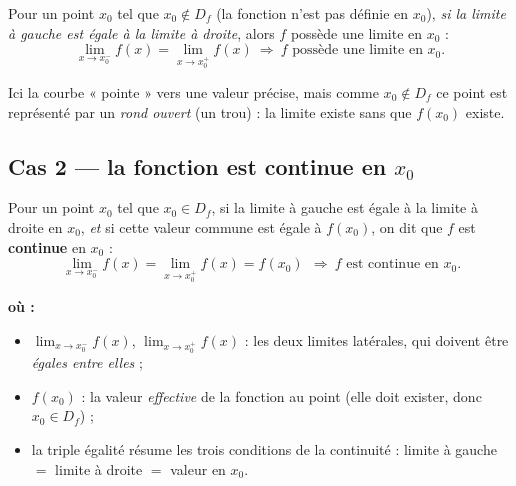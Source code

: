 \documentclass[11pt,a4paper]{article}
\newenvironment{ou}{%
  \par\smallskip\noindent\textbf{où :}\nopagebreak
  \begin{itemize}[leftmargin=1.8em,topsep=2pt,itemsep=1.5pt,parsep=0pt]}%
  {\end{itemize}}
\begin{document}
\begin{theoreme}
Pour un point $x_0$ tel que $x_0\notin D_f$ (la fonction n'est pas définie en $x_0$),
\emph{si la limite à gauche est égale à la limite à droite}, alors $f$ possède une limite en $x_0$ :
\[ \lim_{x\to x_0^{-}} f(x)=\lim_{x\to x_0^{+}} f(x)\ \Longrightarrow\ f\text{ possède une limite en }x_0. \]
\end{theoreme}

\noindent Ici la courbe « pointe » vers une valeur précise, mais comme $x_0\notin D_f$ ce point
est représenté par un \emph{rond ouvert} (un trou) : la limite existe sans que $f(x_0)$ existe.

\begin{center}
\end{center}

\subsection{Cas 2 — la fonction est continue en \texorpdfstring{$x_0$}{x0}}

\begin{definition}
Pour un point $x_0$ tel que $x_0\in D_f$, si la limite à gauche est égale à la limite à droite
en $x_0$, \emph{et} si cette valeur commune est égale à $f(x_0)$, on dit que $f$ est
\textbf{continue} en $x_0$ :
\[ \boxed{\ \lim_{x\to x_0^{-}} f(x)=\lim_{x\to x_0^{+}} f(x)=f(x_0)\ }\ \Longrightarrow\ f\text{ est continue en }x_0. \]
\end{definition}

\begin{ou}
  \item $\displaystyle\lim_{x\to x_0^{-}} f(x)$, $\displaystyle\lim_{x\to x_0^{+}} f(x)$ : les deux limites latérales, qui doivent être \emph{égales entre elles} ;
  \item $f(x_0)$ : la valeur \emph{effective} de la fonction au point (elle doit exister, donc $x_0\in D_f$) ;
  \item la triple égalité résume les trois conditions de la continuité : limite à gauche $=$ limite à droite $=$ valeur en $x_0$.
\end{ou}
\end{document}
